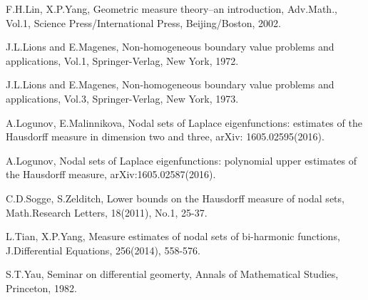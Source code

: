 \documentclass[a4paper, 12pt, onecolumn]{article} \textwidth 148mm
\begin{document}
\begin{thebibliography}{}
 F.H.Lin, X.P.Yang, Geometric measure theory--an introduction, Adv.Math., Vol.1, Science Press/International Press, Beijing/Boston, 2002.

 J.L.Lions and E.Magenes, Non-homogeneous boundary value problems and applications, Vol.1, Springer-Verlag, New York, 1972.

 J.L.Lions and E.Magenes, Non-homogeneous boundary value problems and applications, Vol.3, Springer-Verlag, New York, 1973.

 A.Logunov, E.Malinnikova, Nodal sets of Laplace eigenfunctions: estimates of the Hausdorff measure in dimension two and three, arXiv: 1605.02595(2016).

 A.Logunov, Nodal sets of Laplace eigenfunctions: polynomial upper estimates of the Hausdorff measure, arXiv:1605.02587(2016).

 C.D.Sogge, S.Zelditch, Lower bounds on the Hausdorff measure of nodal sets, Math.Research Letters, 18(2011), No.1, 25-37.

 L.Tian, X.P.Yang, Measure estimates of nodal sets of bi-harmonic functions, J.Differential Equations, 256(2014), 558-576.

 S.T.Yau, Seminar on differential geomerty, Annals of Mathematical Studies, Princeton, 1982.

\end{thebibliography}
\end{document}
